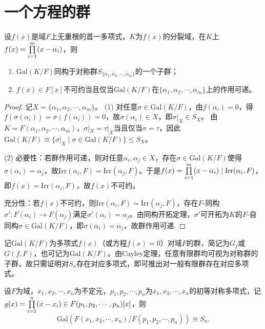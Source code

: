 \documentclass[../../main.tex]{subfiles}%
\begin{document}
\section{一个方程的群}

\begin{theorem}
设$f(x)$是域$F$上无重根的首一多项式，$K$为$f(x)$的分裂域，在$K$上$f(x)=\prod\limits_{i=1}^m\limits (x-\alpha_i)$，则
\begin{enumerate}[(1)]
\item $\mathrm{Gal}(K/F)$同构于对称群$S_{\{\alpha_1,\alpha_2,\cdots,\alpha_m\}}$的一个子群；
\item $f(x)\in F[x]$不可约当且仅当$\mathrm{Gal}(K/F)$在$\{\alpha_1,\alpha_2,\cdots,\alpha_m\}$上的作用可递。
\end{enumerate}
\end{theorem}

\begin{proof}

记$X=\{\alpha_1,\alpha_2,\cdots,\alpha_m\}$。
(1) 对任意$\sigma\in\mathrm{Gal}(K/F)$，由$f(\alpha_i)=0$，得$f(\sigma(\alpha_i))=\sigma(f(\alpha_i))=0$，故$\sigma(\alpha_i)\in X$，即$\sigma|_X\in S_X$。
由$K=F(\alpha_1,\alpha_2,\cdots,\alpha_m)$，$\sigma|_X=\tau|_X$当且仅当$\sigma=\tau$，因此$\mathrm{Gal}(K/F)\cong\{\sigma|_X\mid \sigma\in\mathrm{Gal}(K/F)\}\leqslant S_X$。

(2) 必要性：若群作用可递，则对任意$\alpha_i,\alpha_j\in X$，存在$\sigma\in\mathrm{Gal}(K/F)$使得$\sigma(\alpha_i)=\alpha_j$，故$\mathrm{Irr}(\alpha_i,F)=\mathrm{Irr}(\alpha_j,F)$。于是$f(x)=\prod\limits_{i=1}^m\limits (x-\alpha_i)\mid \mathrm{Irr}(\alpha_i,F)$，即$f(x)=\mathrm{Irr}(\alpha_i,F)$，故$f(x)$不可约。

充分性：若$f(x)$不可约，则$\mathrm{Irr}(\alpha_i,F)=\mathrm{Irr}(\alpha_j,F)$，存在$F$-同构$\sigma'\colon F(\alpha_i)\to F(\alpha_j)$满足$\sigma'(\alpha_i)=\alpha_j$。由同构开拓定理，$\sigma'$可开拓为$K$的$F$-自同构$\sigma\in\mathrm{Gal}(K/F)$，即$\sigma(\alpha_i)=\alpha_j$，故群作用可递.

\end{proof}

\begin{remark}
记$\mathrm{Gal}(K/F)$为多项式$f(x)$（或方程$f(x)=0$）对域$F$的群，简记为$G_f$或$G(f,F)$，也可记为$\mathrm{Gal}(K/F)$。由Cayley定理，任意有限群均可视为对称群的子群，故只需证明对$S_n$存在对应多项式，即可推出对一般有限群存在对应多项式。
\end{remark}

\begin{theorem}
设$F$为域，$x_1,x_2,\cdots,x_n$为不定元，$p_1,p_2,\cdots,p_n$为$x_1,x_2,\cdots,x_n$的初等对称多项式，记$g(x)=\prod\limits_{i=1}^n\limits (x-x_i)\in F(p_1,p_2,\cdots,p_n)[x]$，则
$$\mathrm{Gal}(F(x_1,x_2,\cdots,x_n)/F(p_1,p_2,\cdots,p_n))\cong S_n.$$
\end{theorem}
\end{document}
